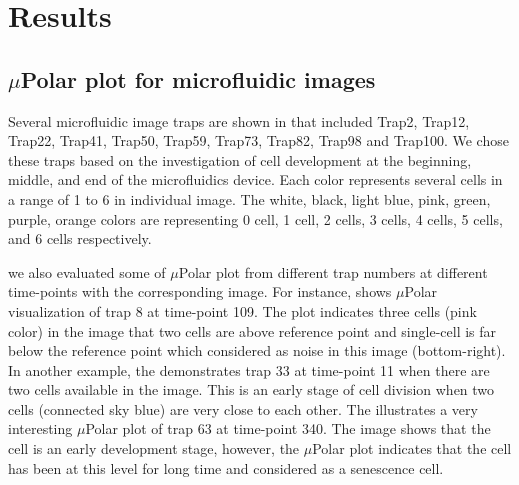 \documentclass[conference]{IEEEtran}
\begin{document}
\section{Results}


\subsection{$\mu$Polar plot for microfluidic images}
Several microfluidic image traps are shown in  that included Trap2, Trap12, Trap22, Trap41, Trap50, Trap59, Trap73, Trap82, Trap98 and Trap100. We chose these traps based on the investigation of cell development at the beginning, middle, and end of the microfluidics device. Each color represents several cells in a range of 1 to 6 in individual image. The white, black, light blue, pink, green, purple, orange colors are representing 0 cell, 1 cell, 2 cells, 3 cells, 4 cells, 5 cells, and 6 cells respectively.

we also evaluated some of $\mu$Polar plot from different trap numbers at different time-points with the corresponding image. For instance,  shows $\mu$Polar visualization of trap 8 at time-point 109. The plot indicates three cells (pink color) in the image that two cells are above reference point and single-cell is far below the reference point which considered as noise in this image (bottom-right). In another example, the  demonstrates trap 33 at time-point 11 when there are two cells available in the image. This is an early stage of cell division when two cells (connected sky blue) are very close to each other.  The  illustrates a very interesting $\mu$Polar plot of trap 63 at time-point 340. The image shows that the cell is an early development stage, however, the $\mu$Polar plot indicates that the cell has been at this level for long time and considered as a senescence cell. 
\end{document}
